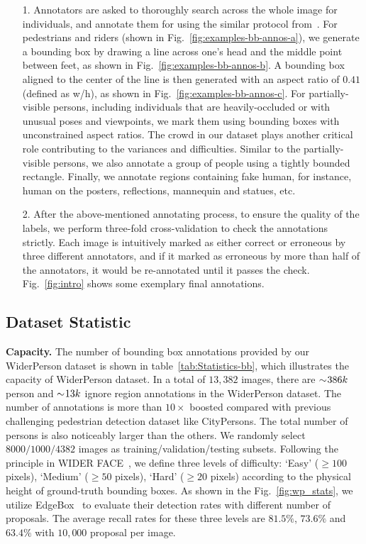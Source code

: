 \documentclass[journal]{IEEEtran}
\begin{document}
\begin{itemize}
\item[1.] Annotators are asked to thoroughly search across the whole image for individuals, and annotate them for using the similar protocol from~\cite{DBLP:conf/cvpr/ZhangBS17}. For pedestrians and riders (shown in Fig.~\ref{fig:examples-bb-annos-a}), we generate a bounding box by drawing a line across one's head and the middle point between feet, as shown in Fig.~\ref{fig:examples-bb-annos-b}. A bounding box aligned to the center of the line is then generated with an aspect ratio of $0.41$ (defined as w/h), as shown in Fig.~\ref{fig:examples-bb-annos-c}. For partially-visible persons, including individuals that are heavily-occluded or with unusual poses and viewpoints, we mark them using bounding boxes with unconstrained aspect ratios. The crowd in our dataset plays another critical role contributing to the variances and difficulties. Similar to the partially-visible persons, we also annotate a group of people using a tightly bounded rectangle. Finally, we annotate regions containing fake human, for instance, human on the posters, reflections, mannequin and statues, etc.

\item[2.] After the above-mentioned annotating process, to ensure the quality of the labels, we perform three-fold cross-validation to check the annotations strictly. Each image is intuitively marked as either correct or erroneous by three different annotators, and if it marked as erroneous by more than half of the annotators, it would be re-annotated until it passes the check. Fig.~\ref{fig:intro} shows some exemplary final annotations.
\end{itemize}


\subsection{Dataset Statistic} \label{sec:dataset_stat}

{\flushleft \textbf{Capacity. }}
The number of bounding box annotations provided by our WiderPerson dataset is shown in table~\ref{tab:Statistics-bb}, which illustrates the capacity of WiderPerson dataset. In a total of $13,382$ images, there are $\sim\negmedspace 386k$ person and $\sim\negmedspace 13k$ ignore region annotations in the WiderPerson dataset. The number of annotations is more than $10\times$ boosted compared with previous challenging pedestrian detection dataset like CityPersons. The total number of persons is also noticeably larger than the others. We randomly select $8000/1000/4382$ images as training/validation/testing subsets. Following the principle in WIDER FACE~\cite{DBLP:conf/cvpr/YangLLT16}, we define three levels of difficulty: `Easy' ($\geq100$ pixels), `Medium' ($\geq50$ pixels), `Hard' ($\geq20$ pixels) according to the physical height of ground-truth bounding boxes. As shown in the Fig.~\ref{fig:wp_stats}, we utilize EdgeBox~\cite{DBLP:conf/eccv/ZitnickD14} to evaluate their detection rates with different number of proposals. The average recall rates for these three levels are $81.5\%$, $73.6\%$ and $63.4\%$ with $10,000$ proposal per image.
\end{document}
